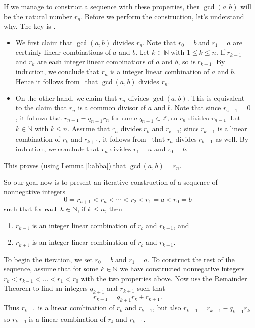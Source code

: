 \documentclass[11pt,dvipsnames]{book}
\def\Z{\mathbb{Z}}
\def\N{{\mathbb{N}}}
\numberwithin{equation}{section} %
\numberwithin{figure}{section} %
\numberwithin{table}{section} %
\begin{document}
If we manage to construct a sequence with these properties, then $\gcd(a,b)$ will be the natural number $r_n$.
Before we perform the construction, let's understand why.
The key is \easylemma.
\begin{itemize}
\item We first claim that $\gcd(a,b)$ divides $r_{n}$.
Note that $r_0=b$ and $r_1=a$ are certainly linear combinations of $a$ and $b$.
Let $k\in \N$ with $1\leq k \leq n$.
If $r_{k-1}$ and $r_k$ are each integer linear combinations of $a$ and $b$, so is $r_{k+1}$.
By induction, we conclude that $r_n$ is a integer linear combination of $a$ and $b$.
Hence it follows from \easylemma\ that $\gcd(a,b)$ divides $r_n$.
\item On the other hand, we claim that $r_{n}$ divides $\gcd(a,b)$.
This is equivalent to the claim that $r_n$ is a common divisor of $a$ and $b$.
Note that since $r_{n+1}=0$, it follows that $r_{n-1}=q_{n+1}r_{n}$ for some $q_{n+1}\in\Z$, so $r_{n}$ divides $r_{n-1}$.
Let $k\in \N$ with $k \leq n$.
Assume that $r_n$ divides $r_k$ and $r_{k+1}$; since $r_{k-1}$ is a linear combination of $r_k$ and $r_{k+1}$, it follows from \easylemma\ that $r_n$ divides $r_{k-1}$ as well.
By induction, we conclude that $r_n$ divides $r_1=a$ and $r_0=b$. 
\end{itemize}
This proves (using Lemma \ref{l:abba}) that $\gcd(a,b)=r_n$.

So our goal now is to present an iterative construction of a sequence of nonnegative integers
\[
0 = r_{n+1} < r_n < \cdots < r_2 < r_1 = a < r_0 = b
\]
such that for each $k \in \N$, if $k\leq n$, then
\begin{enumerate}
    \item $r_{k-1}$ is an integer linear combination of $r_k$ and $r_{k+1}$, and
    \item $r_{k+1}$ is an integer linear combination of $r_k$ and $r_{k-1}$.
\end{enumerate}

To begin the iteration, we set $r_0 = b$ and $r_1 = a$.
To construct the rest of the sequence, assume that for some $k\in\N$ we have constructed nonnegative integers $r_k < r_{k-1} < \dots < r_1 < r_0$ with the two properties above.
Now use the Remainder Theorem to find an integers $q_{k+1}$ and $r_{k+1}$ such that
\[
r_{k-1} = q_{k+1}r_k + r_{k+1}.
\]
Thus $r_{k-1}$ is a linear combination of $r_k$ and $r_{k+1}$, but also $r_{k+1} = r_{k-1} - q_{k+1} r_k$ so $r_{k+1}$ is a linear combination of $r_k$ and $r_{k-1}$.
\end{document}
